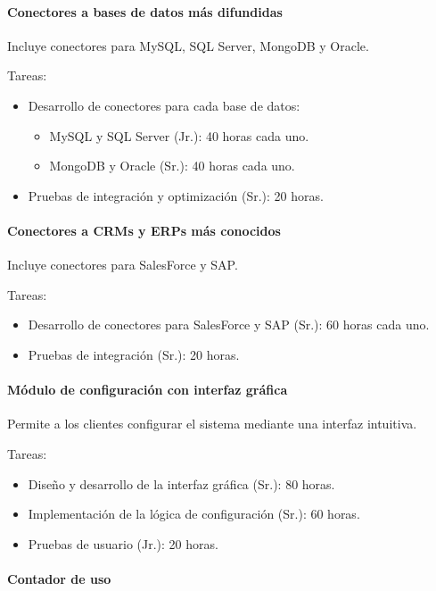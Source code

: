 \paragraph{Conectores a bases de datos más difundidas}

Incluye conectores para MySQL, SQL Server, MongoDB y Oracle.

Tareas:
\begin{itemize}
    \item Desarrollo de conectores para cada base de datos:
    \begin{itemize}
        \item MySQL y SQL Server (Jr.): 40 horas cada uno.
        \item MongoDB y Oracle (Sr.): 40 horas cada uno.
    \end{itemize}
    \item Pruebas de integración y optimización (Sr.): 20 horas.
\end{itemize}

\paragraph{Conectores a CRMs y ERPs más conocidos}

Incluye conectores para SalesForce y SAP.

Tareas:
\begin{itemize}
    \item Desarrollo de conectores para SalesForce y SAP (Sr.): 60 horas cada uno.
    \item Pruebas de integración (Sr.): 20 horas.
\end{itemize}

\paragraph{Módulo de configuración con interfaz gráfica}

Permite a los clientes configurar el sistema mediante una interfaz intuitiva.

Tareas:
\begin{itemize}
    \item Diseño y desarrollo de la interfaz gráfica (Sr.): 80 horas.
    \item Implementación de la lógica de configuración (Sr.): 60 horas.
    \item Pruebas de usuario (Jr.): 20 horas.
\end{itemize}

\paragraph{Contador de uso}

